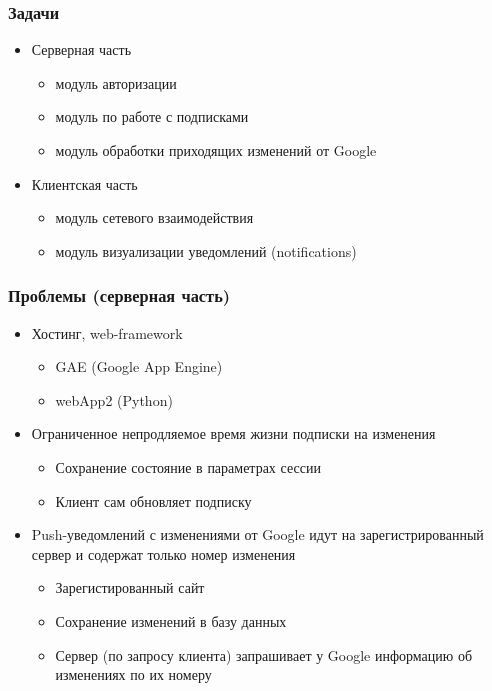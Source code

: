 \documentclass[10pt,pdf,hyperref={unicode}]{beamer}
\begin{document}
    \begin{frame}\frametitle{Задачи}
        \begin{itemize}%
        	\item Серверная часть
	        \begin{itemize}
                \item модуль авторизации
                \item модуль по работе с подписками
                \item модуль обработки приходящих изменений от Google
            \end{itemize}            
            \pause
        	\item Клиентская часть
	        \begin{itemize}
                \item модуль сетевого взаимодействия
                \item модуль визуализации уведомлений (notifications)
            \end{itemize}                        
        \end{itemize}
    \end{frame}
    
    \begin{frame}\frametitle{Проблемы (серверная часть)}
        \begin{itemize}%
	        \item	Хостинг, web-framework
	        \pause
            \begin{itemize}
                \item GAE (Google App Engine)
                \item webApp2 (Python)       
            \end{itemize}
	        \pause            
            \item	Ограниченное непродляемое время жизни подписки на изменения
	        \pause
            \begin{itemize}
                \item Сохранение состояние в параметрах сессии
                \item Клиент сам обновляет подписку
            \end{itemize}
	        \pause
            \item	Push-уведомлений с изменениями от Google идут на зарегистрированный сервер и содержат только номер изменения
	        \pause
            \begin{itemize}
                \item Зарегистированный сайт
                \item Сохранение изменений в базу данных
                \item Сервер (по запросу клиента) запрашивает у Google информацию об изменениях по их номеру
            \end{itemize}
        \end{itemize}
    \end{frame}
    
\end{document}
